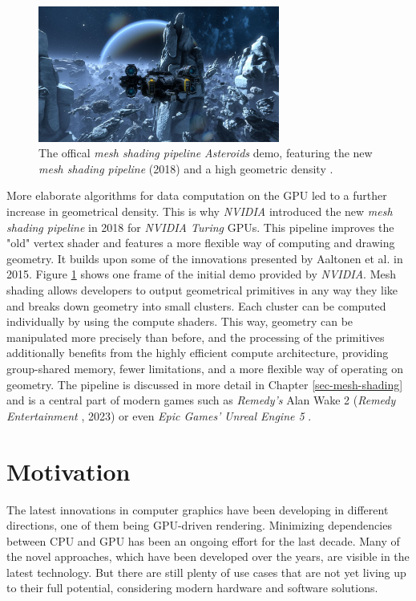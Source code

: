 \begin{figure}[h]
    \centering
    \includegraphics[width=300px]{images/graphics/mesh-shading-asteroids-demo.jpg}
    \caption{The offical \emph{mesh shading pipeline} \emph{Asteroids} demo, featuring the new \emph{mesh shading pipeline} (2018)
    and a high geometric density \cite{Kraemer2018}.}
    \label{fig:mesh-shading-asteroids-demo}
\end{figure}

\noindent
More elaborate algorithms for data computation on the \ac{GPU} led to a further increase in geometrical density.
This is why \emph{NVIDIA} introduced the new \emph{mesh shading pipeline} in 2018 for \emph{NVIDIA Turing} \ac{GPU}s.
This pipeline improves the "old" vertex shader and features a more flexible way of computing and drawing geometry. 
It builds upon some of the innovations presented by Aaltonen et al.  \cite{Aaltonen2015} in 2015. Figure 
\ref{fig:mesh-shading-asteroids-demo} shows one frame of the initial demo provided by \emph{NVIDIA}. Mesh shading 
allows developers to output geometrical primitives in any way they like and breaks down geometry into small clusters.
Each cluster can be computed individually by using the compute shaders. This way, geometry can be manipulated more 
precisely than before, and the processing of the primitives additionally benefits from the highly efficient compute 
architecture, providing group-shared memory, fewer limitations, and a more flexible way of operating on geometry.
The pipeline is discussed in more detail in Chapter \ref{sec-mesh-shading} and is a central part of modern games 
such as \emph{Remedy's} Alan Wake 2 (\emph{Remedy Entertainment} \cite{AlanWake22023}, 2023) or even 
\emph{Epic Games'} \emph{Unreal Engine 5} \cite{Karis2021}. 


\section{Motivation} \label{sec-motivation}

The latest innovations in computer graphics have been developing in different directions,
one of them being \ac{GPU}-driven rendering. Minimizing dependencies between \ac{CPU} and \ac{GPU} 
has been an ongoing effort for the last decade. Many of the novel approaches, which have been developed 
over the years, are visible in the latest technology. But there are still plenty of use cases that are 
not yet living up to their full potential, considering modern hardware and software solutions.\\

